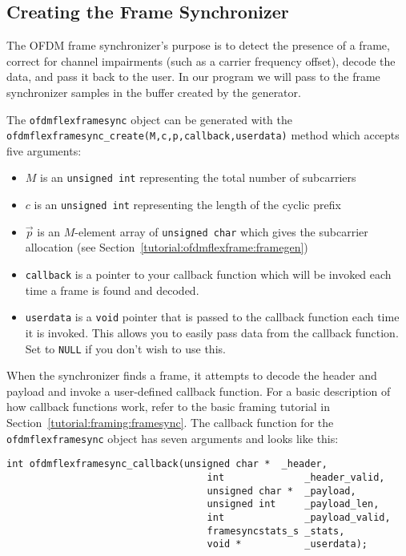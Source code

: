 \subsection{Creating the Frame Synchronizer}
\label{tutorial:ofdmflexframe:framesync}
The OFDM frame synchronizer's purpose is to detect the presence of a
frame, correct for channel impairments (such as a carrier frequency
offset), decode the data, and pass it back to the user.
In our program we will pass to the frame synchronizer samples in the
buffer created by the generator.

The {\tt ofdmflexframesync} object can be generated with the
{\tt ofdmflexframesync\_create(M,c,p,callback,userdata)} method which
accepts five arguments:
%
\begin{itemize}
\item $M$ is an {\tt unsigned int} representing the total number of
    subcarriers
\item $c$ is an {\tt unsigned int} representing the length of the
    cyclic prefix
\item $\vec{p}$ is an $M$-element array of {\tt unsigned char} which
    gives the subcarrier allocation
    (see Section~\ref{tutorial:ofdmflexframe:framegen})
\item {\tt callback}
    is a pointer to your callback function which will be invoked each
    time a frame is found and decoded.
\item {\tt userdata}
    is a {\tt void} pointer that is passed to the callback function each
    time it is invoked.
    This allows you to easily pass data from the callback function.
    Set to {\tt NULL} if you don't wish to use this.
\end{itemize}
%
When the synchronizer finds a frame, it attempts to decode the header
and payload and invoke a user-defined callback function.
For a basic description of how callback functions work, refer to the
basic framing tutorial in Section~\ref{tutorial:framing:framesync}.
The callback function for the {\tt ofdmflexframesync} object has seven
arguments and looks like this:
%
\begin{Verbatim}[fontsize=\small]
    int ofdmflexframesync_callback(unsigned char *  _header,
                                   int              _header_valid,
                                   unsigned char *  _payload,
                                   unsigned int     _payload_len,
                                   int              _payload_valid,
                                   framesyncstats_s _stats,
                                   void *           _userdata);
\end{Verbatim}
